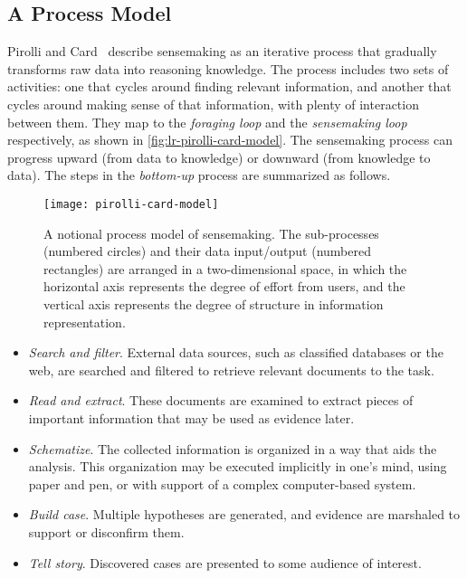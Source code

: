 \subsection{A Process Model}
\label{sub:lr-pcm}
Pirolli and Card~\cite{Pirolli2005} describe sensemaking as an iterative process that gradually transforms raw data into reasoning knowledge. The process includes two sets of activities: one that cycles around finding relevant information, and another that cycles around making sense of that information, with plenty of interaction between them. They map to the \emph{foraging loop} and the \emph{sensemaking loop} respectively, as shown in \autoref{fig:lr-pirolli-card-model}. The sensemaking process can progress upward (from data to knowledge) or downward (from knowledge to data). The steps in the \emph{bottom-up} process are summarized as follows.

\begin{figure}
	\centering
	\texttt{[image: pirolli-card-model]}
	\caption[The Pirolli and Card's model of sensemaking]{A notional process model of sensemaking. The sub-processes (numbered circles) and their data input/output (numbered rectangles) are arranged in a two-dimensional space, in which the horizontal axis represents the degree of effort from users, and the vertical axis represents the degree of structure in information representation. }
	\label{fig:lr-pirolli-card-model}
\end{figure}

\begin{itemize}
	\item \emph{Search and filter}. External data sources, such as classified databases or the web, are searched and filtered to retrieve relevant documents to the task.
	\item \emph{Read and extract}. These documents are examined to extract pieces of important information that may be used as evidence later.
	\item \emph{Schematize}.  The collected information is organized in a way that aids the analysis. This organization may be executed implicitly in one's mind, using paper and pen, or with support of a complex computer-based system.
	\item \emph{Build case}. Multiple hypotheses are generated, and evidence are marshaled to support or disconfirm them.
	\item \emph{Tell story}. Discovered cases are presented to some audience of interest.
\end{itemize}

